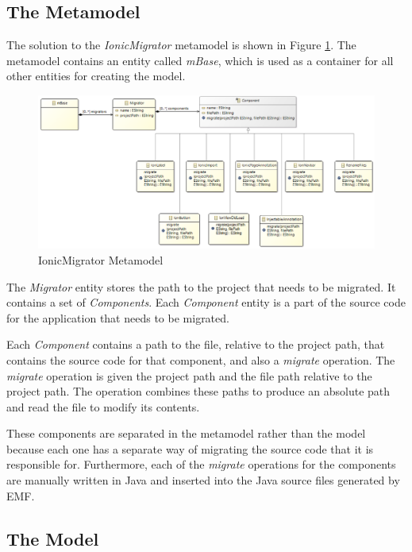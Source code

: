 \documentclass[conference]{IEEEtran}
\begin{document}
\subsection{The Metamodel}

The solution to the \textit{IonicMigrator} metamodel is shown in Figure \ref{fig:metamodel}. The metamodel contains an entity called \textit{mBase}, which is used as a container for all other entities for creating the model.

\begin{figure}[htbp]
\centerline{\includegraphics[width=\linewidth,keepaspectratio]{metamodel.png}}
\caption{IonicMigrator Metamodel}
\label{fig:metamodel}
\end{figure}

The \textit{Migrator} entity stores the path to the project that needs to be migrated. It contains a set of \textit{Components}. Each \textit{Component} entity is a part of the source code for the application that needs to be migrated.

Each \textit{Component} contains a path to the file, relative to the project path, that contains the source code for that component, and also a \textit{migrate} operation. The \textit{migrate} operation is given the project path and the file path relative to the project path. The operation combines these paths to produce an absolute path and read the file to modify its contents.

These components are separated in the metamodel rather than the model because each one has a separate way of migrating the source code that it is responsible for. Furthermore, each of the \textit{migrate} operations for the components are manually written in Java and inserted into the Java source files generated by EMF.

\subsection{The Model}
\end{document}
